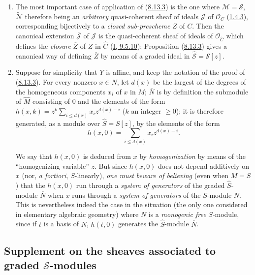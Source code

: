 \begin{remark}[8.13.4]
\label{II.8.13.4}
\begin{enumerate}
  \item[\rm{(i)}] The most important case of application of
  (\hyperref[II.8.13.3]{8.13.3}) is the one where
  $\mathcal{M}=\mathcal{S}$, $\widetilde{\mathcal{N}}$ therefore being an
  \emph{arbitrary} quasi-coherent sheaf of ideals $\mathcal{J}$ of
  $\mathcal{O}_C$ (\hyperref[II.1.4.3]{1.4.3}), corresponding
  bijectively to a \emph{closed sub-prescheme} $Z$ of $C$. Then the
  canonical extension $\overline{\mathcal{J}}$ of $\mathcal{J}$ is the
  quasi-coherent sheaf of ideals of $\mathcal{O}_{\widehat{C}}$ which defines
  the \emph{closure} $\overline{Z}$ of $Z$ in $\widehat{C}$
  (\hyperref[I.9.5.10]{I, 9.5.10}); Proposition
  (\hyperref[II.8.13.3]{8.13.3}) gives a canonical way of defining
  $\overline{Z}$ by means of a graded ideal in
  $\widehat{\mathcal{S}}=\mathcal{S}[z]$.
  \item[\rm{(ii)}] Suppose for simplicity that $Y$ is affine, and keep
  the notation of the proof of
  (\hyperref[II.8.13.3]{8.13.3}). For every nonzero $x\in N$, let $d(x)$
  be the largest of the degrees of the homogeneous components $x_i$ of $x$ in
  $M$; $\overline{N}$ is by definition the submodule of $\widehat{M}$
  consisting of $0$ and the elements of the form
  $h(x,k)=z^k\sum_{i\leqslant d(x)}x_i z^{d(x)-i}$ ($k$ an integer
  $\geqslant0$); it is therefore generated, as a module over
  $\widehat{S}=S[z]$, by the elements of the form
  \[
    h(x,0)=\sum_{i\leqslant d(x)}x_i z^{d(x)-i}.
  \]

  We say that $h(x,0)$ is deduced from $x$ by \emph{homogenization} by
  means of the ``homogenizing variable'' $z$. But since $h(x,0)$ does not
  depend additively on $x$ (nor, \emph{a fortiori}, $S$-linearly), \emph{one
  must beware of believing} (even when $M=S$) that the $h(x,0)$ run through a
  \emph{system of generators} of the graded $\widehat{S}$-module
  $\overline{N}$ when $x$ runs through a \emph{system of
  generators} of the $S$-module $N$. This is nevertheless indeed the case in
  the situation (the only one considered in elementary algebraic geometry)
  where $N$ is a \emph{monogenic free} $S$-module, since if $t$ is a basis of
  $N$, $h(t,0)$ generates the $\widehat{S}$-module $\overline{N}$.
\end{enumerate}
\end{remark}


\subsection{Supplement on the sheaves associated to
graded $\mathcal{S}$-modules}
\label{subsection:II.8.14}

